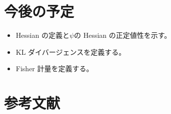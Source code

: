 \documentclass[report]{jlreq}
\begin{document}
%
\section{今後の予定}

\begin{itemize}
    \item Hessian の定義と$\psi$の Hessian の正定値性を示す。
    \item KL ダイバージェンスを定義する。
    \item Fisher 計量を定義する。
\end{itemize}

%
\section{参考文献}

\nocite{amari_information_2016}
\nocite{dudley_18466_2003}
\nocite{brown_fundamentals_1986}

{
    \renewcommand{\bibsection}{}
    
    
}
\end{document}
